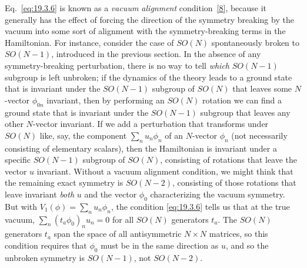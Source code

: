 Eq.~\eqref{eq:19.3.6} is known as a \emph{vacuum alignment} condition~\hyperref[ch19-ref-8]{[8]}, because it generally has the effect of forcing the direction of the symmetry breaking by the vacuum into some sort of alignment with the symmetry-breaking terms in the Hamiltonian. For instance, consider the case of $SO(N)$ spontaneously broken to $SO(N-1)$, introduced in the previous section. In the absence of any symmetry-breaking perturbation, there is no way to tell \emph{which} $SO(N-1)$ subgroup is left unbroken; if the dynamics of the theory leads to a ground state that is invariant under the $SO(N-1)$ subgroup of $SO(N)$ that leaves some $N$-vector $\phi_{0n}$ invariant, then by performing an $SO(N)$ rotation we can find a ground state that is invariant under the $SO(N-1)$ subgroup that leaves any other $N$-vector invariant. If we add a perturbation that transforms under $SO(N)$ like, say, the component $\sum_n u_n\phi_n$ of an $N$-vector $\phi_n$ (not necessarily consisting of elementary scalars), then the Hamiltonian is invariant under a specific $SO(N-1)$ subgroup of $SO(N)$, consisting of rotations that leave the vector $u$ invariant. Without a vacuum alignment condition, we might think that the remaining exact symmetry is $SO(N-2)$, consisting of those rotations that leave invariant \emph{both} $u$ and the vector $\phi_0$ characterizing the vacuum symmetry. But with $V_1(\phi)=\sum_n u_n\phi_n$, the condition \eqref{eq:19.3.6} tells us that at the true vacuum, $\sum_n(t_a\phi_0)_n u_n=0$ for all $SO(N)$ generators $t_a$. The $SO(N)$ generators $t_a$ span the space of all antisymmetric $N\times N$ matrices, so this condition requires that $\phi_0$ must be in the same direction as $u$, and so the unbroken symmetry is $SO(N-1)$, not $SO(N-2)$.

